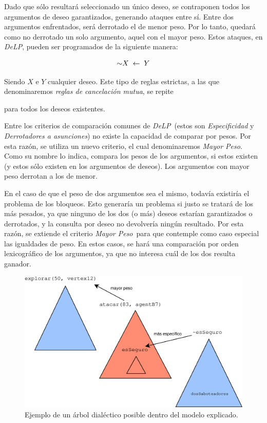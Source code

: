 \documentclass[oneside]{book}
\theoremstyle{definition}
\theoremstyle{example}
\newcommand{\DLP}{\mbox{\textit{DeLP}}}
\newcommand{\no}{\mbox{$\sim$}}
\newcommand{\srule}[2]{\mbox{$ #1\;\leftarrow\;#2$}}
\newcommand{\nlA}[1]{$$\mbox{#1}$$}
\begin{document}
Dado que sólo resultará seleccionado un único deseo, se contraponen todos los argumentos 
de deseo garantizados, generando ataques entre sí. Entre dos argumentos enfrentados, será
derrotado el de menor peso. Por lo tanto, quedará como no derrotado un solo argumento, 
aquel con el mayor peso. Estos ataques, en \DLP, pueden ser programados de la 
siguiente manera:

\nlA{\srule{\no X}{Y}}

Siendo $X$ e $Y$ cualquier deseo. Este tipo de reglas estrictas, a las que
denominaremos \textit{reglas de cancelación mutua}, se repite 

para todos los deseos existentes.

Entre los criterios de comparación comunes de \DLP\ (estos son \textit{Especificidad} y 
\textit{Derrotadores a asunciones}) no existe la capacidad de comparar por pesos. 
Por esta razón, se utiliza un nuevo criterio, el cual 
denominaremos \textit{Mayor Peso}. Como su nombre lo indica, compara los pesos de los 
argumentos, si estos existen (y estos sólo existen en los argumentos de deseos). Los 
argumentos con mayor peso derrotan a los de menor.

En el caso de que el peso de dos argumentos sea el mismo, todavía existiría el problema 
de los bloqueos. Esto generaría un problema si justo se tratará de los más pesados, ya 
que ninguno de los dos (o más) deseos estarían garantizados o derrotados, y la consulta
por deseo no devolvería ningún resultado. Por esta razón, se extiende el criterio 
\textit{Mayor Peso}\ para que contemple como caso especial las igualdades de peso. En 
estos casos, se hará una comparación por orden lexicográfico de los argumentos, ya que
no interesa cuál de los dos resulta ganador. 

\begin{figure}
 \includegraphics[width=\textwidth]{mamarracho.eps}
 \caption{Ejemplo de un árbol dialéctico posible dentro del modelo explicado.}
 \label{fig:mamarracho}
\end{figure}
\end{document}
